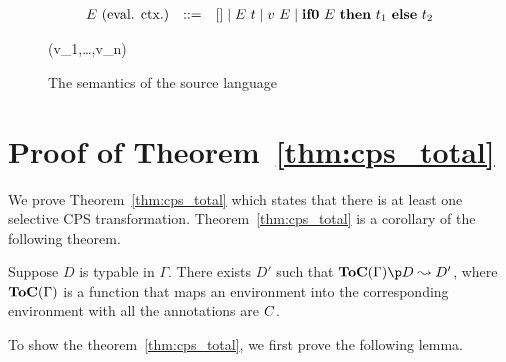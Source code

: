 \begin{figure}[t]
\[
\begin{array}{lrl}
E\text{ (eval. ctx.)} &::=& [] \mid {E}~{t} \mid {v}~{E} \mid \mathbf{if0}~{E}~\mathbf{then}~{t_1}~\mathbf{else}~{t_2}
\end{array}
\]


\infrule
 {}
 { \red \Denote{\OP}(v_1,\dots,v_n)}








\caption{The semantics of the source language}
\label{fig:source-semantics}
\end{figure}


\section{Proof of Theorem~\ref{thm:cps_total}}

We prove Theorem~\ref{thm:cps_total} which states that there is at least
one selective CPS transformation.
Theorem~\ref{thm:cps_total} is a corollary of the following theorem.

\begin{theorem}
Suppose $D$ is typable in $\Gamma$. There exists $D'$ such that
$\CPSprog{\ToC{\Gamma}}{D}{D'}$, where $\mathbf{ToC}(\Gamma)$ is a function that
maps an environment into the corresponding environment
with all the annotations are $C$.
\end{theorem}

To show the theorem~\ref{thm:cps_total},
we first prove the following lemma.

